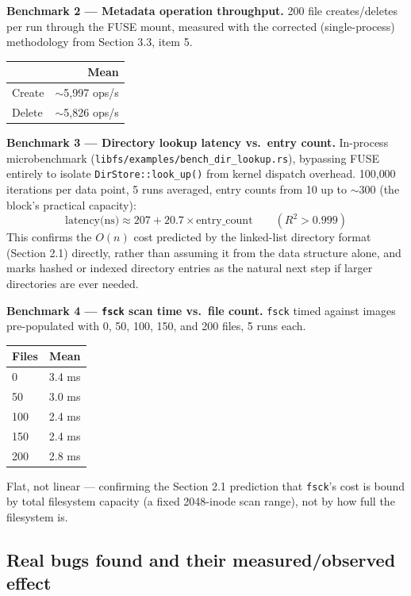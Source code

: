 \documentclass[11pt]{article}
\begin{document}
\textbf{Benchmark 2 --- Metadata operation throughput.} 200 file creates/deletes per run through the
FUSE mount, measured with the corrected (single-process) methodology from Section 3.3, item 5.

\begin{center}
\begin{tabular}{lr}
\toprule
 & \textbf{Mean} \\
\midrule
Create & $\sim$5{,}997 ops/s \\
Delete & $\sim$5{,}826 ops/s \\
\bottomrule
\end{tabular}
\end{center}

\textbf{Benchmark 3 --- Directory lookup latency vs.\ entry count.} In-process microbenchmark
(\texttt{libfs/examples/bench\_dir\_lookup.rs}), bypassing FUSE entirely to isolate
\texttt{DirStore::look\_up()} from kernel dispatch overhead. 100{,}000 iterations per data point, 5
runs averaged, entry counts from 10 up to $\sim$300 (the block's practical capacity):
\[
\text{latency(ns)} \approx 207 + 20.7 \times \text{entry\_count} \qquad (R^2 > 0.999)
\]
This confirms the $O(n)$ cost predicted by the linked-list directory format (Section 2.1) directly,
rather than assuming it from the data structure alone, and marks hashed or indexed directory entries
as the natural next step if larger directories are ever needed.

\textbf{Benchmark 4 --- \texttt{fsck} scan time vs.\ file count.} \texttt{fsck} timed against images
pre-populated with 0, 50, 100, 150, and 200 files, 5 runs each.

\begin{center}
\begin{tabular}{lr}
\toprule
\textbf{Files} & \textbf{Mean} \\
\midrule
0   & 3.4 ms \\
50  & 3.0 ms \\
100 & 2.4 ms \\
150 & 2.4 ms \\
200 & 2.8 ms \\
\bottomrule
\end{tabular}
\end{center}
Flat, not linear — confirming the Section 2.1 prediction that \texttt{fsck}'s cost is bound by total
filesystem capacity (a fixed 2048-inode scan range), not by how full the filesystem is.

\subsection{Real bugs found and their measured/observed effect}
\end{document}
